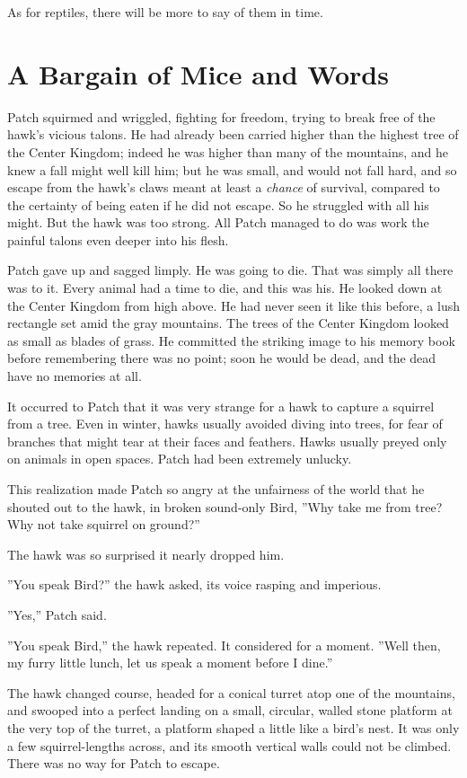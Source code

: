 \documentclass[12pt]{book}
\begin{document}
As for reptiles, there will be more to say of them in time.


\section{A Bargain of Mice and Words}

Patch squirmed and wriggled, fighting for freedom, trying to break free of the hawk's vicious talons. He had already been carried higher than the highest tree of the Center Kingdom; indeed he was higher than many of the mountains, and he knew a fall might well kill him; but he was small, and would not fall hard, and so escape from the hawk's claws meant at least a {\it chance} of survival, compared to the certainty of being eaten if he did not escape. So he struggled with all his might. But the hawk was too strong. All Patch managed to do was work the painful talons even deeper into his flesh.

Patch gave up and sagged limply. He was going to die. That was simply all there was to it. Every animal had a time to die, and this was his. He looked down at the Center Kingdom from high above. He had never seen it like this before, a lush rectangle set amid the gray mountains. The trees of the Center Kingdom looked as small as blades of grass. He committed the striking image to his memory book before remembering there was no point; soon he would be dead, and the dead have no memories at all.

It occurred to Patch that it was very strange for a hawk to capture a squirrel from a tree. Even in winter, hawks usually avoided diving into trees, for fear of branches that might tear at their faces and feathers. Hawks usually preyed only on animals in open spaces. Patch had been extremely unlucky.

This realization made Patch so angry at the unfairness of the world that he shouted out to the hawk, in broken sound-only Bird, ''Why take me from tree? Why not take squirrel on ground?''

The hawk was so surprised it nearly dropped him.

''You speak Bird?'' the hawk asked, its voice rasping and imperious.

''Yes,'' Patch said.

''You speak Bird,'' the hawk repeated. It considered for a moment. ''Well then, my furry little lunch, let us speak a moment before I dine.''

The hawk changed course, headed for a conical turret atop one of the mountains, and swooped into a perfect landing on a small, circular, walled stone platform at the very top of the turret, a platform shaped a little like a bird's nest. It was only a few squirrel-lengths across, and its smooth vertical walls could not be climbed. There was no way for Patch to escape.
\end{document}

